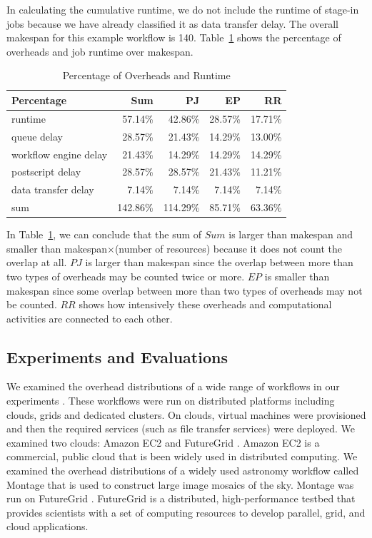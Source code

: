 \documentclass[final,5p,times,twocolumn]{elsarticle}
\begin{document}
In calculating the cumulative runtime, we do not include the runtime of stage-in jobs because we have already classified it as data transfer delay. The overall makespan for this example workflow is 140. Table~\ref{tab:model_percentage_overhead} shows the percentage of overheads and job runtime over makespan.  

\begin{table}[h!]
\caption{Percentage of Overheads and Runtime}
\label{tab:model_percentage_overhead}
\centering
\begin{tabular}{lrrrr}
\hline
Percentage & Sum & PJ & EP &RR\\

\hline

runtime & 57.14\% & 42.86\% & 28.57\% &17.71\% \\
queue delay & 28.57\% &21.43\% &14.29\% &13.00\% \\
workflow engine delay & 21.43\% &14.29\%& 14.29\% &14.29\%\\
postscript delay & 28.57\% & 28.57\% & 21.43\% & 11.21\% \\
data transfer delay & 7.14\% & 7.14\% & 7.14\% & 7.14\% \\
sum & 142.86\% & 114.29\% & 85.71\% & 63.36\%\\
\hline
\end{tabular}
\end{table} 


In Table~\ref{tab:model_percentage_overhead}, we can conclude that the sum of $Sum$ is larger than makespan and smaller than makespan$\times$(number of resources) because it does not count the overlap at all. $PJ$ is larger than makespan since the overlap between more than two types of overheads may be counted twice or more. $EP$ is smaller than makespan since some overlap between more than two types of overheads may not be counted.  $RR$ shows how intensively these overheads and computational activities are connected to each other. 

\subsection{Experiments and Evaluations}

We examined the overhead distributions of a wide range of workflows in our experiments . These workflows were run on distributed platforms including clouds, grids and dedicated clusters. 
On clouds, virtual machines were provisioned and then the required services (such as file transfer services) were deployed. 
We examined two clouds: Amazon EC2 \cite{AmazonEC2}  and FutureGrid \cite{FutureGrid}. Amazon EC2 is a commercial, public cloud that is been widely used in distributed computing. 
We examined the overhead distributions of a widely used astronomy workflow called Montage \cite{Berriman2004} that is used to construct large image mosaics of the sky. Montage was run on FutureGrid \cite{FutureGrid}. FutureGrid is a distributed, high-performance testbed that provides scientists with a set of computing resources to develop parallel, grid, and cloud applications. 
\end{document}
